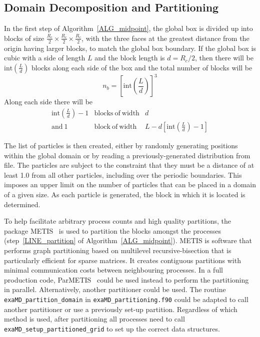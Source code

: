 \documentclass[paper=a4, fontsize=11pt,bibtotoc]{scrartcl}		%
\newcommand{\TT}[1]{\texttt{#1}}
\begin{document}
\subsection{Domain Decomposition and Partitioning} \label{SEC_Partitioning}

In the first step of Algorithm~\ref{ALG_midpoint}, the global box is divided up into blocks of size 
$\frac{R_c}{2}\times\frac{R_c}{2}\times\frac{R_c}{2}$, with the three faces at the greatest distance from the origin having larger blocks, 
to match the global box boundary. If the global box is cubic with a side of length $L$ and the block length is $d=R_c/2$, 
then there will be $\mathrm{int}\left(\frac{L}{d}\right)$ blocks along each side of the box and the total number of blocks will be
\begin{equation}
	n_b = \left[\mathrm{int}\left(\frac{L}{d}\right)\right]^3 \nonumber
\end{equation} 
Along each side there will be
\begin{eqnarray}
	\mathrm{int}\left(\frac{L}{d}\right) -1 &\mathrm{blocks~of~width}& d \nonumber \\
	\mathrm{and~1} &\mathrm{block~of~width}& L -d\left[\mathrm{int}\left(\frac{L}{d}\right) - 1 \right] \nonumber
\end{eqnarray}

The list of particles is then created, either by randomly generating positions within the global domain or by reading a previously-generated 
distribution from file. The particles are subject to the constraint that 
they must be a distance of at least 1.0 from all other particles, including over the periodic boundaries. This imposes an upper limit on the number 
of particles that can be placed in a domain of a given size. As each particle is generated, the block in which it is located is determined. 

To help facilitate arbitrary process counts and high quality partitions, the package METIS~\cite{Karypis06} is used to partition the blocks 
amongst the processes (step~\ref{LINE_partition} of Algorithm~\ref{ALG_midpoint}). METIS is software that performs graph partitioning based
on multilevel recursive-bisection that is particularly efficient for sparse matrices. It creates contiguous partitions with minimal 
communication costs between neighbouring processes. In a full 
production code, ParMETIS~\cite{Karypis02} could be used instead to perform the partitioning in parallel. Alternatively, another partitioner could 
be used. The routine \TT{exaMD\_partition\_domain} in \TT{exaMD\_partitioning.f90} could be adapted to call another partitioner or use a 
previously set-up partition. Regardless of which method is used, after partitioning all processes need to call \TT{exaMD\_setup\_partitioned\_grid} to 
set up the correct data structures.
\end{document}

